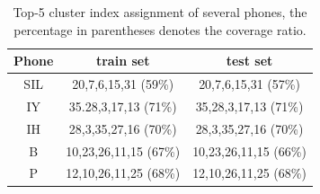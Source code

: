 \begin{table}[ht!]
\centering
\caption{Top-5 cluster index assignment of several phones, the percentage in parentheses denotes the coverage ratio.}
\small
\begin{tabular}{c|c|c}
\toprule
Phone & train set             & test set              \\ \midrule
SIL       & 20,7,6,15,31 (59\%)   & 20,7,6,15,31 (57\%)   \\ \hline
IY        & 35.28,3,17,13 (71\%)  & 35,28,3,17,13 (71\%)  \\
IH        & 28,3,35,27,16 (70\%)  & 28,3,35,27,16 (70\%)  \\ \hline
B         & 10,23,26,11,15 (67\%) & 10,23,26,11,15 (66\%) \\
P         & 12,10,26,11,25 (68\%) & 12,10,26,11,25 (68\%) \\ \bottomrule
\end{tabular}

\label{tb:idx_stats}
\end{table}


\begin{table}[t!]
\centering
\caption{The summary of statistics of corpus ByteQA.}
\label{tab:dataset}
\end{table}


